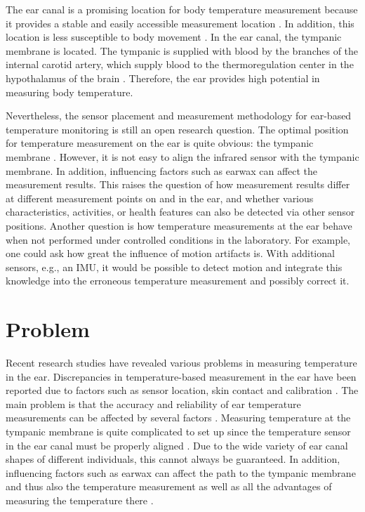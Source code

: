 The ear canal is a promising location for body temperature measurement because it provides a stable and easily accessible measurement location \cite{ericksonComparisonEarbasedBladder1993}.
In addition, this location is less susceptible to body movement \cite{grossmanFrequencyVelocityRotational1988, kavanaghRoleNeckTrunk2006a}.
In the ear canal, the tympanic membrane is located.
The tympanic is supplied with blood by the branches of the internal carotid artery, which supply blood to the thermoregulation center in the hypothalamus of the brain \cite{moranCoreTemperatureMeasurement2002a}.
Therefore, the ear provides high potential in measuring body temperature.

Nevertheless, the sensor placement and measurement methodology for ear-based temperature monitoring is still an open research question. 
The optimal position for temperature measurement on the ear is quite obvious: the tympanic membrane \cite{childsTympanicMembraneTemperature1999, kimComparisonBilateralEardrum2022, mumaComparisonRectalAxillary1991}.
However, it is not easy to align the infrared sensor with the tympanic membrane.
In addition, influencing factors such as earwax can affect the measurement results. 
This raises the question of how measurement results differ at different measurement points on and in the ear, and whether various characteristics, activities, or health features can also be detected via other sensor positions.
Another question is how temperature measurements at the ear behave when not performed under controlled conditions in the laboratory.
For example, one could ask how great the influence of motion artifacts is.
With additional sensors, e.g., an IMU, it would be possible to detect motion and integrate this knowledge into the erroneous temperature measurement and possibly correct it.

\section{Problem}
\label{ch:Introduction:Problem}
Recent research studies have revealed various problems in measuring temperature in the ear.
Discrepancies in temperature-based measurement in the ear have been reported due to factors such as sensor location, skin contact and calibration \cite{rohrbergTemperatureMeasurementEar1997, gasimAccuracyTympanicTemperature2013, amoateng-adjepongAccuracyInfraredTympanic1999a, hookerScreeningFeverAdult1996a, cattaneoAccuracyPrecisionBody2000}.
The main problem is that the accuracy and reliability of ear temperature measurements can be affected by several factors \cite{gasimAccuracyTympanicTemperature2013}. 
Measuring temperature at the tympanic membrane is quite complicated to set up since the temperature sensor in the ear canal must be properly aligned \cite{amoateng-adjepongAccuracyInfraredTympanic1999a, gasimAccuracyTympanicTemperature2013}. 
Due to the wide variety of ear canal shapes of different individuals, this cannot always be guaranteed.
In addition, influencing factors such as earwax can affect the path to the tympanic membrane and thus also the temperature measurement as well as all the advantages of measuring the temperature there \cite{gasimAccuracyTympanicTemperature2013}.


